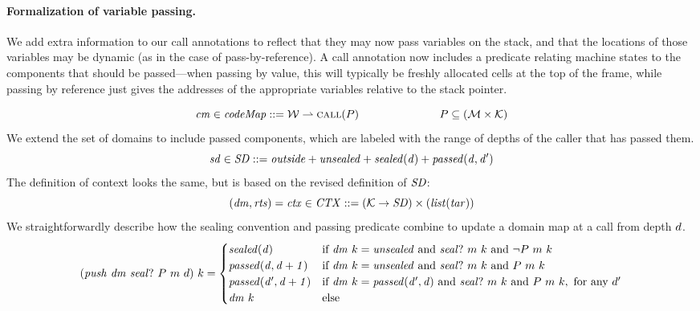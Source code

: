 \documentclass[acmsmall,review,anonymous]{acmart}\settopmatter{printfolios=true,printccs=false,printacmref=false}
\begin{document}
{\paragraph{Formalization of variable passing.}
We add extra information to our call
annotations to reflect that they may now pass variables on the stack, and that the locations
of those variables may be dynamic (as in the case of pass-by-reference).
A call annotation now includes a predicate relating machine states to the components
that should be passed---when passing by value, this will typically be freshly allocated
cells at the top of the frame, while passing by reference just gives the
addresses of the appropriate variables relative to the stack pointer.

\[\mathit{cm} \in \mathit{codeMap} ::= {\mathcal W} \rightharpoonup \text{\sc call}(P) \hspace*{1in} P \subseteq ({\mathcal M} \times {\mathcal K})\]
We extend the set of domains to include passed components,
which are labeled with the range of depths of the caller that has passed them.
\[\mathit{sd} \in \mathit{SD} ::= \mathit{outside} + \mathit{unsealed} + \mathit{sealed(d)} + \mathit{passed(d,d')}\]
The definition of context looks the same, but is based on the revised definition of \(\mathit{SD}\):
\[(\mathit{dm},\mathit{rts}) = \mathit{ctx} \in \mathit{CTX} ::= ({\mathcal K} \rightarrow \mathit{SD})
 \times (\mathit{list} (\mathit{tar})) \]
We straightforwardly describe how the sealing convention and passing predicate combine to
update a domain map at a call from depth \(d\).
\[(\mathit{push} ~ \mathit{dm} ~ \mathit{seal?} ~ P ~ m ~ d) ~ k =
\begin{cases}
  \mathit{sealed(d)}              & \text{if } \mathit{dm} ~ k = \mathit{unsealed} \text{ and }
                                 \mathit{seal?} ~ m ~ k \text{ and } \neg P ~ m ~ k \\
  \mathit{passed(d,d+1)}     & \text{if } \mathit{dm} ~ k = \mathit{unsealed} \text{ and }
                                 \mathit{seal?} ~ m ~ k \text{ and } P ~ m ~ k \\
  \mathit{passed(d',d+1)}    & \text{if } \mathit{dm} ~ k = \mathit{passed(d',d)} \text{ and }
                                 \mathit{seal?} ~ m ~ k \text{ and } P ~ m ~ k,
                                 \text{ for any } d' \\
  \mathit{dm}~k & \text{else} \\
\end{cases}\]

}
\end{document}
